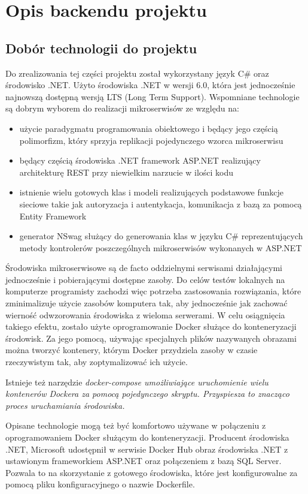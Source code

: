 \documentclass{SGGW-thesis}
\begin{document}
\chapter{Opis backendu projektu}
  \section{Dobór technologii do projektu}
  Do zrealizowania tej części projektu został wykorzystany język C# oraz środowisko .NET. Użyto środowiska .NET w wersji 6.0, która jest jednocześnie najnowszą dostępną wersją LTS (Long Term Support). Wspomniane technologie są dobrym wyborem do realizacji mikroserwisów ze względu na:
  
  \begin{itemize}
    \item użycie paradygmatu programowania obiektowego i będący jego częścią polimorfizm, który sprzyja replikacji pojedynczego wzorca mikroserwisu
    \item będący częścią środowiska .NET framework ASP.NET realizujący architekturę REST przy niewielkim narzucie w ilości kodu
    \item istnienie wielu gotowych klas i modeli realizujących podstawowe funkcje sieciowe takie jak autoryzacja i autentykacja, komunikacja z bazą za pomocą Entity Framework
    \item generator NSwag służący do generowania klas w języku C# reprezentujących metody kontrolerów poszczególnych mikroserwisów wykonanych w ASP.NET
  \end{itemize}

  Środowiska mikroserwisowe są de facto oddzielnymi serwisami działającymi jednocześnie i pobierającymi dostępne zasoby. Do celów testów lokalnych na komputerze programisty zachodzi więc potrzeba zastosowania rozwiązania, które zminimalizuje użycie zasobów komputera tak, aby jednocześnie jak zachować wierność odwzorowania środowiska z wieloma serwerami. W celu osiągnięcia takiego efektu, zostało użyte oprogramowanie Docker służące do konteneryzacji środowisk. Za jego pomocą, używając specjalnych plików nazywanych obrazami można tworzyć kontenery, którym Docker przydziela zasoby w czasie rzeczywistym tak, aby zoptymalizować ich użycie. 
  
  Istnieje też narzędzie \it{docker-compose} umożliwiające uruchomienie wielu kontenerów Dockera za pomocą pojedynczego skryptu. Przyspiesza to znacząco proces uruchamiania środowiska.

  Opisane technologie mogą też być komfortowo używane w połączeniu z oprogramowaniem Docker służącym do konteneryzacji. Producent środowiska .NET, Microsoft udostępnił w serwisie Docker Hub obraz środowiska .NET z ustawionym frameworkiem ASP.NET oraz połączeniem z bazą SQL Server. Pozwala to na skorzystanie z gotowego środowiska, które jest konfigurowalne za pomocą pliku konfiguracyjnego o nazwie Dockerfile.
\end{document}
